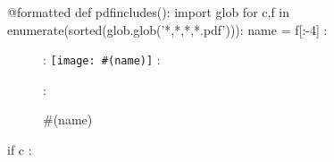 {%
@formatted
def pdfincludes():
    import glob
    for c,f in enumerate(sorted(glob.glob('*,*,*,*.pdf'))):
        name = f[:-4]
        : \begin{figure}[p]
        : \texttt{[image: \#(name)]}
        : \caption{#(name)}
        : \end{figure}
        if c%
            : \clearpage
}%

\documentclass[a4]{article}
\usepackage{graphicx}



@pdfincludes


